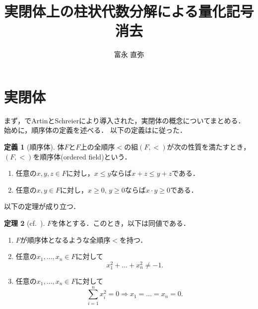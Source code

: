 \documentclass[uplatex, dvipdfmx]{jsarticle}
\numberwithin{equation}{section}
\theoremstyle{definition}
\newtheorem{definition}{定義}[section]
\newtheorem{theorem}[definition]{定理}
\begin{document}
\title{実閉体上の柱状代数分解による量化記号消去}
\author{富永 直弥}
\maketitle


\section{実閉体}

まず，\cite{MR3069467}でArtinとSchreierにより導入された，実閉体の概念についてまとめる．
始めに，順序体の定義を述べる．
以下の定義は\cite[Definition 1.1.1]{MR1659509}に従った．

\begin{definition}[順序体]
     体$F$と$F$上の全順序$<$の組$(F,<)$が次の性質を満たすとき，$(F,<)$を順序体(ordered field)という．
     \begin{enumerate}
          \item 任意の$x,y,z\in F$に対し，$x \leq y$ならば$x + z \leq y + z$である．
          \item 任意の$x,y \in F$に対し，$x \geq 0$, $y \geq 0$ならば$x \cdot y \geq 0$である．
     \end{enumerate}
\end{definition}

以下の定理が成り立つ．

\begin{theorem}[{cf.~\cite[Theorem 1.1.8]{MR1659509}}]\label{theorem:real-field}
     $F$を体とする．このとき，以下は同値である．
     \begin{enumerate}
          \item \label{theorem:real-field-1}
          $F$が順序体となるような全順序$<$を持つ．
          \item \label{theorem:real-field-2}
          任意の$x_1, \dots, x_n \in F$に対して
          \begin{equation}
               x_1^2 + \dots + x_n^2 \neq -1.
          \end{equation}
          \item \label{theorem:real-field-3}
          任意の$x_1, \dots, x_n \in F$に対して
          \begin{equation}
               \sum_{i=1}^n x_i^2 = 0 \Rightarrow x_1 = \dots = x_n = 0.
          \end{equation}
     \end{enumerate}
\end{theorem}
\end{document}

